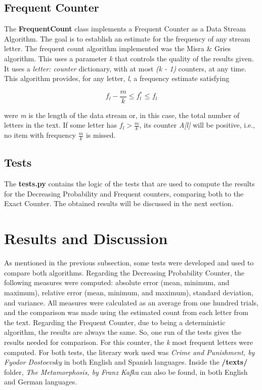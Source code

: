 \documentclass[...]{revdetua}
\begin{document}
\subsection{Frequent Counter}

The \textbf{FrequentCount} class implements a Frequent Counter as a Data Stream Algorithm. The goal is to establish an estimate for the frequency of any stream letter. The frequent count algorithm implemented was the Misra & Gries algorithm. This uses a parameter \textit{k} that controls the quality of the results given. It uses a \textit{{letter: counter}} dictionary, with at most \textit{(k - 1)} counters, at any time.
This algorithm provides, for any letter, \textit{l}, a frequency estimate satisfying

\[
f_l - \frac{m}{k} \leq f_{l}^* \leq f_l
\]

were \textit{m} is the length of the data stream or, in this case, the total number of letters in the text. If some letter has \(f_l > \frac{m}{k}\), its counter \textit{A[l]} will be positive, i.e., no item with frequency \(\frac{m}{k}\) is missed.

\subsection{Tests}

The \textbf{tests.py} contains the logic of the tests that are used to compute the results for the Decreasing Probability and Frequent counters, comparing both to the Exact Counter. The obtained results will be discussed in the next section.

\section{Results and Discussion}

As mentioned in the previous subsection, some tests were developed and used to compare both algorithms. 
Regarding the Decreasing Probability Counter, the following measures were computed: absolute error (mean, minimum, and maximum), relative error (mean, minimum, and maximum), standard deviation, and variance. All measures were calculated as an average from one hundred trials, and the comparison was made using the estimated count from each letter from the text.
Regarding the Frequent Counter, due to being a deterministic algorithm, the results are always the same. So, one run of the tests gives the results needed for comparison. For this counter, the \textit{k} most frequent letters were computed.
For both tests, the literary work used was \textit{Crime and Punishment, by Fyodor Dostoevsky} in both English and Spanish languages. Inside the \textbf{/texts/} folder, \textit{The Metamorphosis, by Franz Kafka} can also be found, in both English and German languages.
\end{document}
